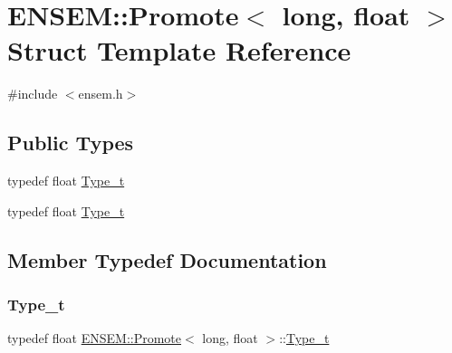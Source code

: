 \hypertarget{structENSEM_1_1Promote_3_01long_00_01float_01_4}{}\section{E\+N\+S\+EM\+:\+:Promote$<$ long, float $>$ Struct Template Reference}
\label{structENSEM_1_1Promote_3_01long_00_01float_01_4}


{\ttfamily \#include $<$ensem.\+h$>$}

\subsection*{Public Types}
\begin{DoxyCompactItemize}
\item 
typedef float \mbox{\hyperlink{structENSEM_1_1Promote_3_01long_00_01float_01_4_a465824ec9d8cc7704bf91ba4cdeafaad}{Type\+\_\+t}}
\item 
typedef float \mbox{\hyperlink{structENSEM_1_1Promote_3_01long_00_01float_01_4_a465824ec9d8cc7704bf91ba4cdeafaad}{Type\+\_\+t}}
\end{DoxyCompactItemize}


\subsection{Member Typedef Documentation}
\mbox{\label{structENSEM_1_1Promote_3_01long_00_01float_01_4_a465824ec9d8cc7704bf91ba4cdeafaad}} 
\subsubsection{\texorpdfstring{Type\_t}{Type\_t}\hspace{0.1cm}{\footnotesize\ttfamily [1/2]}}
{\footnotesize\ttfamily typedef float \mbox{\hyperlink{structENSEM_1_1Promote}{E\+N\+S\+E\+M\+::\+Promote}}$<$ long, float $>$\+::\mbox{\hyperlink{structENSEM_1_1Promote_3_01long_00_01float_01_4_a465824ec9d8cc7704bf91ba4cdeafaad}{Type\+\_\+t}}}

\mbox{\label{structENSEM_1_1Promote_3_01long_00_01float_01_4_a465824ec9d8cc7704bf91ba4cdeafaad}} 
